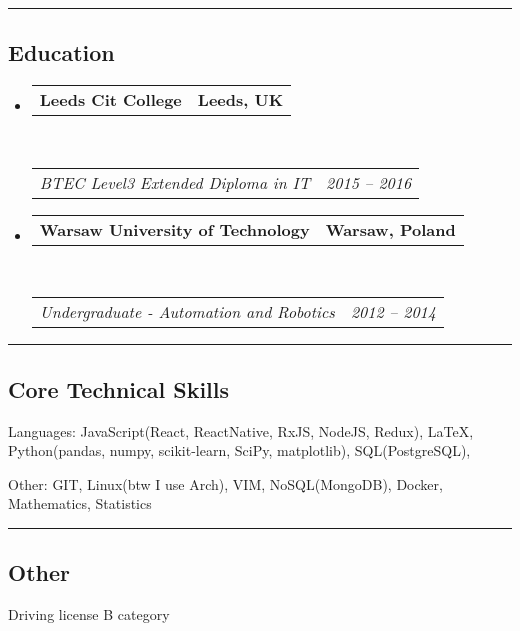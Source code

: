 \documentclass[10pt,letterpaper]{article}
\makeatletter
\newenvironment{indentsection}[1]%
{\begin{list}{}%
	{\setlength{\leftmargin}{#1}}%
	\item[]%
}
{\end{list}}
\newcommand{\headerrow}[2]
{\begin{tabular*}{\linewidth}{l@{\extracolsep{\fill}}r}
	#1 &
	#2 \\
\end{tabular*}}
\makeatother
\begin{document}
\hrule
\vspace{-0.4em}
\subsection*{Education}

\begin{itemize}
	\parskip=0.1em

	\item 
	\headerrow
		{\textbf{Leeds Cit College}}
		{\textbf{Leeds, UK}}
	\\
	\headerrow
		{\emph{BTEC Level3 Extended Diploma in IT}}
		{\emph{2015 -- 2016}}
  \item 
	\headerrow
		{\textbf{Warsaw University of Technology}}
		{\textbf{Warsaw, Poland}}
	\\
	\headerrow
		{\emph{Undergraduate - Automation and Robotics}}
		{\emph{2012 -- 2014}}

\end{itemize}


\hrule
\vspace{-0.4em}
\subsection*{Core Technical Skills}

\begin{indentsection}{\parindent}
\begin{description*}
	\item[Languages:]
	JavaScript(React, ReactNative, RxJS, NodeJS, Redux), \LaTeX, Python(pandas, numpy, scikit-learn, SciPy, matplotlib), SQL(PostgreSQL),
  \item[Other:] GIT, Linux(btw I use Arch), VIM, NoSQL(MongoDB), Docker, Mathematics, Statistics
\end{description*}
\end{indentsection}

\hrule
\vspace{-0.4em}
\subsection*{Other}
\begin{indentsection}{\parindent}
  \begin{description*}
    \item Driving license B category 
  \end{description*}
  \end{indentsection}
\end{document}
